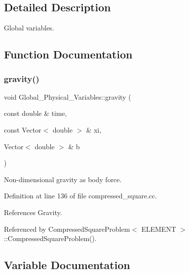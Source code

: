 \subsection{Detailed Description}
Global variables. 

\subsection{Function Documentation}
\mbox{\label{namespaceGlobal__Physical__Variables_a0777aef63372db7f91ad894c38159681}} 
\subsubsection{\texorpdfstring{gravity()}{gravity()}}
{\footnotesize\ttfamily void Global\+\_\+\+Physical\+\_\+\+Variables\+::gravity (\begin{DoxyParamCaption}\item[{const double \&}]{time,  }\item[{const Vector$<$ double $>$ \&}]{xi,  }\item[{Vector$<$ double $>$ \&}]{b }\end{DoxyParamCaption})}



Non-\/dimensional gravity as body force. 



Definition at line 136 of file compressed\+\_\+square.\+cc.



References Gravity.



Referenced by Compressed\+Square\+Problem$<$ E\+L\+E\+M\+E\+N\+T $>$\+::\+Compressed\+Square\+Problem().



\subsection{Variable Documentation}
\mbox{\label{namespaceGlobal__Physical__Variables_a849754fa7155c1a31481674ce4845658}} 
